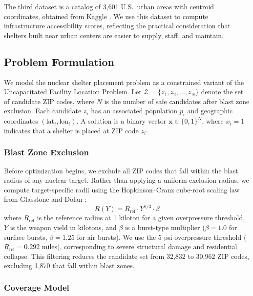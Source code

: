 \documentclass[12pt]{article}
\begin{document}
The third dataset is a catalog of 3,601 U.S.\ urban areas with centroid coordinates, obtained from Kaggle \cite{kaggle_urban}. We use this dataset to compute infrastructure accessibility scores, reflecting the practical consideration that shelters built near urban centers are easier to supply, staff, and maintain.

\subsection{Problem Formulation}

We model the nuclear shelter placement problem as a constrained variant of the Uncapacitated Facility Location Problem. Let $\mathcal{Z} = \{z_1, z_2, \ldots, z_N\}$ denote the set of candidate ZIP codes, where $N$ is the number of safe candidates after blast zone exclusion. Each candidate $z_i$ has an associated population $p_i$ and geographic coordinates $(\text{lat}_i, \text{lon}_i)$. A solution is a binary vector $\mathbf{x} \in \{0, 1\}^N$, where $x_i = 1$ indicates that a shelter is placed at ZIP code $z_i$.

\subsubsection{Blast Zone Exclusion}

Before optimization begins, we exclude all ZIP codes that fall within the blast radius of any nuclear target. Rather than applying a uniform exclusion radius, we compute target-specific radii using the Hopkinson--Cranz cube-root scaling law from Glasstone and Dolan \cite{glasstone1977}:
\begin{equation}
R(Y) = R_{\text{ref}} \cdot Y^{1/3} \cdot \beta
\end{equation}
where $R_{\text{ref}}$ is the reference radius at 1 kiloton for a given overpressure threshold, $Y$ is the weapon yield in kilotons, and $\beta$ is a burst-type multiplier ($\beta = 1.0$ for surface bursts, $\beta = 1.25$ for air bursts). We use the 5 psi overpressure threshold ($R_{\text{ref}} = 0.292$ miles), corresponding to severe structural damage and residential collapse. This filtering reduces the candidate set from 32,832 to 30,962 ZIP codes, excluding 1,870 that fall within blast zones.

\subsubsection{Coverage Model}
\end{document}
